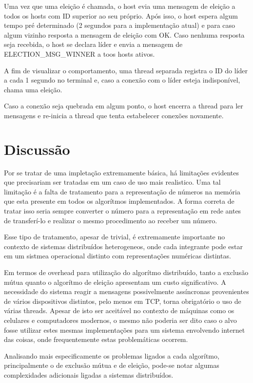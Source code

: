 \documentclass{article}
\begin{document}
Uma vez que uma eleição é chamada, o host evia uma mensagem de eleição a todos
os hosts com ID superior ao seu próprio. Após isso, o host espera algum tempo
pré determinado (2 segundos para a implementação atual) e para caso algum
vizinho resposta a mensagem de eleição com OK. Caso nenhuma resposta seja
recebida, o host se declara líder e envia a mensagem de ELECTION\_MSG\_WINNER a
toos hosts ativos.

A fim de visualizar o comportamento, uma thread separada registra o ID do líder
a cada 1 segundo no terminal e, caso a conexão com o líder esteja indisponível,
chama uma eleição.

Caso a conexão seja quebrada em algum ponto, o host encerra a thread para ler
mensagens e re-inicia a thread que tenta estabelecer conexões novamente. 

\section{Discussão}

Por se tratar de uma impletação extremamente básica, há limitações evidentes que
precisariam ser tratadas em um caso de uso mais realistico. Uma tal limitação é
a falta de tratamento para a representação de números na memória que esta
presente em todos os algorítmos implementados. A forma correta de tratar isso
seria sempre converter o número para a representação em rede antes de
transferí-lo e realizar o mesmo procedimento ao receber um número.

Esse tipo de tratamento, apesar de trivial, é extremamente importante no
contexto de sistemas distribuídos heterogeneos, onde cada integrante pode estar
em um sistmea operacional distinto com representações numéricas distintas.

Em termos de overhead para utilização do algorítmo distribuído, tanto a exclusão
mútua quanto o algorítmo de eleição apresentam um custo significativo. A
necessidade do sistema reagir a mensagens possivelmente assíncronas provenientes
de vários dispositivos distintos, pelo menos em TCP, torna obrigatório o uso de
várias threads. Apesar de isto ser aceitável no contexto de máquinas como os
celulares e computadores modernos, o mesmo não poderia ser dito caso o alvo
fosse utilizar estes mesmas implementações para um sistema envolvendo internet
das coisas, onde frequentemente estas problemáticas ocorrem. 

Analisando mais especificamente os problemas ligados a cada algorítmo,
principalmente o de exclusão mútua e de eleição, pode-se notar algumas
complexidades adicionais ligadas a sistemas distribuídos.  
\end{document}
